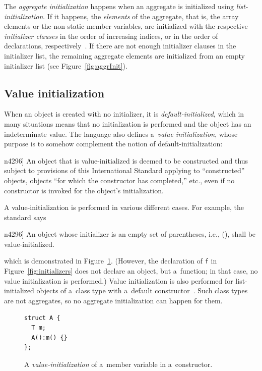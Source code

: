 \documentclass[nolot,nolof,nocover,printed]{fithesis3}
\newcommand{\stdN}[2]{\cite[#2]{#1}\xspace}
\begin{document}
The \textit{aggregate initialization} happens when an aggregate is initialized using \textit{list-initialization}. If it happens, the \textit{elements} of the aggregate, that is, the array elements or the non-static member variables, are initialized with the respective \textit{initializer clauses} in the order of increasing indices, or in the order of declarations, respectively~\stdN{n4296}{\S 8.5.1/2}. If there are not enough initializer clauses in the initializer list, the remaining aggregate elements are initialized from an empty initializer list (see Figure~\ref{fig:aggrInit}).

\subsection{Value initialization}

When an object is created with no initializer, it is \textit{default-initialized}, which in many situations means that no initialization is performed and the object has an indeterminate value. The language also defines a~\textit{value initialization}, whose purpose is to somehow complement the notion of default-initialization:
\begin{displayquote}[\stdN{n4296}{\S 8.5/8}]
\textelp{} An object that is value-initialized is deemed to be constructed and thus subject to provisions of this International Standard applying to \enquote{constructed} objects, objects \enquote{for which the constructor has completed,} etc., even if no constructor is invoked for the object’s initialization.
\end{displayquote}

A value-initialization is performed in various different cases. For example, the standard says
\begin{displayquote}[\stdN{n4296}{\S 8.5/11}]
An object whose initializer is an empty set of parentheses, i.e., (), shall be value-initialized.\textelp{}
\end{displayquote}
which is demonstrated in Figure~\ref{fig:valueInitMember}. (However, the declaration of \lstinline|f| in Figure~\ref{fig:initializers} does not declare an object, but a~function; in that case, no value initialization is performed.) Value initialization is also performed for list-initialized objects of a~class type with a~default constructor~\stdN{n4296}{\S 8.5.4/5.4}. Such class types are not aggregates, so no aggregate initialization can happen for them.

\begin{figure}[ht]
\begin{lstlisting}
struct A {
  T m;
  A():m() {}
};
\end{lstlisting}
\caption{A \textit{value-initialization} of a~member variable in a~constructor.}
\label{fig:valueInitMember}
\end{figure}
\end{document}
